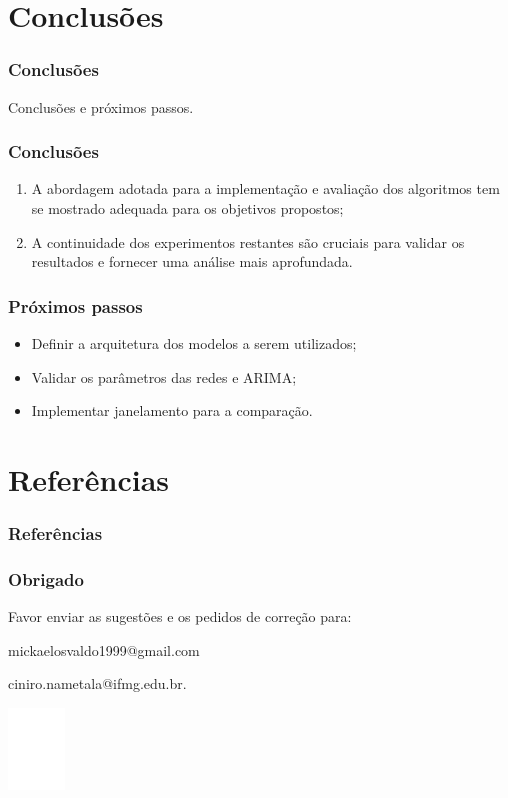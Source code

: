 \documentclass[aspectratio=169]{beamer}
\begin{document}
\section{Conclusões}

\begin{frame} \frametitle{Conclusões}
	\begin{center}
		Conclusões e próximos passos.
\end{center}
	
\end{frame}


\begin{frame}[fragile] \frametitle{Conclusões}
	\begin{enumerate}
		\item A abordagem adotada para a implementação e avaliação dos algoritmos tem se mostrado
		adequada para os objetivos propostos;
		
		\item A continuidade dos experimentos restantes são
	cruciais para validar os resultados e fornecer uma análise mais aprofundada.
	\end{enumerate}
\end{frame}


\begin{frame}[fragile] \frametitle{Próximos passos}
	\begin{itemize} \itemsep1em
		\item Definir a arquitetura dos modelos a serem utilizados;
		\item Validar os parâmetros das redes e ARIMA;
		\item Implementar janelamento para a comparação.
	\end{itemize}
\end{frame}

\section{Referências}

\begin{frame}[allowframebreaks] 
\frametitle{Referências}
  \printbibliography 
\end{frame}

\begin{frame} \frametitle{Obrigado}
\begin{center}
 \vspace*{2em}

 Favor enviar as sugestões e os pedidos de correção para:

 mickaelosvaldo1999@gmail.com 
 
 ciniro.nametala@ifmg.edu.br.

 \vspace*{2em}
 \includegraphics[width=1.5cm]{logoif}
\end{center}
\end{frame}
\end{document}
